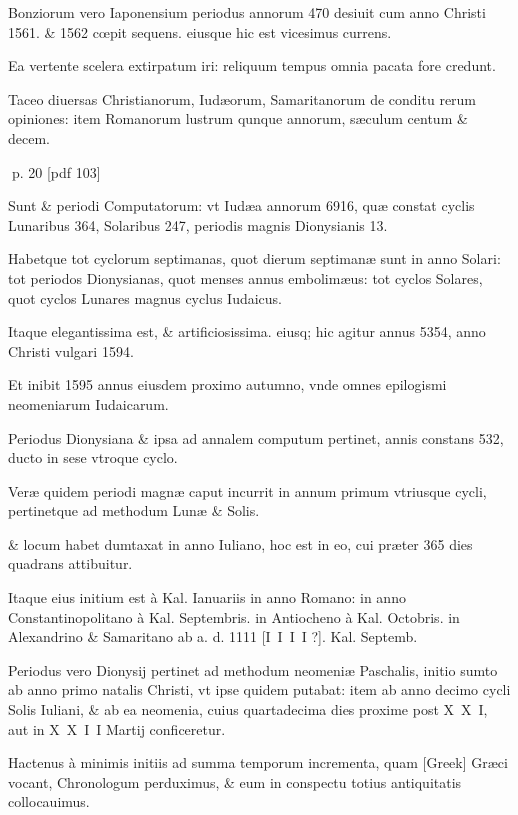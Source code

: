 \begin{parnumbers}
Bonziorum vero Iaponensium periodus annorum 470 desiuit cum anno Christi 1561. \& 1562 cœpit sequens. eiusque hic est vicesimus currens.

Ea vertente scelera extirpatum iri: reliquum tempus omnia pacata fore credunt.

Taceo diuersas Christianorum, Iudæorum, Samaritanorum de conditu rerum opiniones: item Romanorum lustrum qunque annorum, sæculum centum \& decem.

\end{parnumbers}
\clearpage
p. 20 [pdf 103]

\begin{parnumbers}

Sunt \& periodi Computatorum: vt Iudæa  annorum 6916, quæ constat cyclis Lunaribus 364, Solaribus 247, periodis magnis Dionysianis 13.

Habetque tot cyclorum septimanas, quot dierum septimanæ sunt in anno Solari: tot periodos Dionysianas, quot menses annus embolimæus: tot cyclos Solares, quot cyclos Lunares magnus cyclus Iudaicus.

Itaque elegantissima est, \& artificiosissima. eiusq; hic agitur annus 5354, anno Christi vulgari 1594.

Et inibit 1595 annus eiusdem proximo autumno, vnde omnes epilogismi neomeniarum Iudaicarum.

Periodus Dionysiana \& ipsa ad annalem computum pertinet, annis constans 532, ducto in sese vtroque cyclo.

Veræ quidem periodi magnæ caput incurrit in annum primum vtriusque cycli, pertinetque ad methodum Lunæ \& Solis. 

\& locum habet dumtaxat in anno Iuliano, hoc est in eo, cui præter 365 dies quadrans attibuitur.

Itaque eius initium est à Kal. Ianuariis in anno Romano: in anno Constantinopolitano à Kal. Septembris. in Antiocheno à Kal. Octobris. in Alexandrino \& Samaritano ab a. d. 1111 [I I I I ?]. Kal. Septemb.

Periodus vero Dionysij pertinet ad methodum neomeniæ Paschalis, initio sumto ab anno primo natalis Christi, vt ipse quidem putabat: item ab anno decimo cycli Solis Iuliani, \& ab ea neomenia, cuius quartadecima dies proxime post X X I, aut in X X I I Martij conficeretur.

Hactenus à minimis initiis ad summa temporum incrementa, quam \textgreek{[Greek]} Græci vocant, Chronologum perduximus, \& eum in conspectu totius antiquitatis collocauimus. 


\end{parnumbers}
